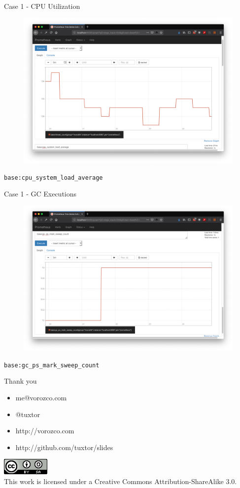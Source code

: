 \documentclass{beamer}
\begin{document}
\begin{frame}{Case 1 - CPU Utilization}

\begin{figure}
	\centering
	\includegraphics[width=0.8\linewidth]{Images/mono2}
\end{figure}
\lstinline|base:cpu_system_load_average|
\end{frame}

\begin{frame}{Case 1 - GC Executions}

\begin{figure}
	\centering
	\includegraphics[width=0.8\linewidth]{Images/mono3}
\end{figure}
\lstinline|base:gc_ps_mark_sweep_count|
\end{frame}





\begin{frame}{Thank you}
\begin{itemize}
\item me@vorozco.com
\item @tuxtor
\item http://vorozco.com
\item http://github.com/tuxtor/slides
\end{itemize}
\begin{center}
\includegraphics[width=0.1\linewidth]{Images/cclogo}
\\
This work is licensed under a Creative Commons Attribution-ShareAlike 3.0.
\end{center}
\end{frame}
\end{document}
